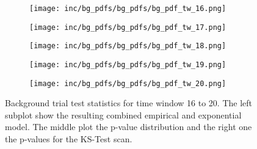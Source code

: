\begin{figure}[htpb]
  \begin{subfigure}[c]{\textwidth}
    \texttt{[image: inc/bg\_pdfs/bg\_pdfs/bg\_pdf\_tw\_16.png]}
  \end{subfigure}
  \begin{subfigure}[c]{\textwidth}
    \texttt{[image: inc/bg\_pdfs/bg\_pdfs/bg\_pdf\_tw\_17.png]}
  \end{subfigure}
  \begin{subfigure}[c]{\textwidth}
    \texttt{[image: inc/bg\_pdfs/bg\_pdfs/bg\_pdf\_tw\_18.png]}
  \end{subfigure}
  \begin{subfigure}[c]{\textwidth}
    \texttt{[image: inc/bg\_pdfs/bg\_pdfs/bg\_pdf\_tw\_19.png]}
  \end{subfigure}
  \begin{subfigure}[c]{\textwidth}
    \texttt{[image: inc/bg\_pdfs/bg\_pdfs/bg\_pdf\_tw\_20.png]}
  \end{subfigure}
  \caption{Background trial test statistics for time window 16 to 20. The left subplot show the resulting combined empirical and exponential model. The middle plot the p-value distribution and the right one the p-values for the KS-Test scan.}
\end{figure}

